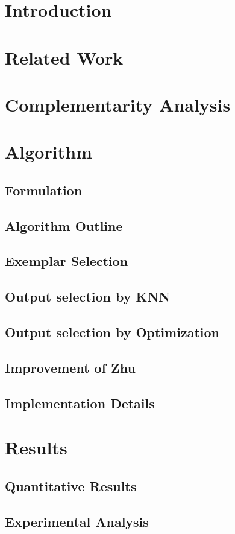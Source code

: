 \section{Introduction}


\section{Related Work}


\section{Complementarity Analysis}


\section{Algorithm}


\subsection{Formulation}


\subsection{Algorithm Outline}


\subsection{Exemplar Selection}


\subsection{Output selection by KNN}


\subsection{Output selection by Optimization}


\subsection{Improvement of Zhu \etal}


\subsection{Implementation Details}


\section{Results}


\subsection{Quantitative Results}


\subsection{Experimental Analysis}

